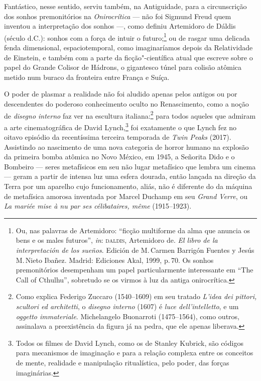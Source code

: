 Fantástico, nesse sentido, serviu também, na Antiguidade, para a
circunscrição dos sonhos premonitórios na \emph{Onirocrítica} --- não
foi Sigmund Freud quem inventou a interpretação dos sonhos ---, como
definiu Artemidoro de Dáldis (século  d.C.): sonhos com a força de
intuir o futuro;\footnote{Ou, nas palavras de Artemidoro: ``ficção
  multiforme da alma que anuncia os bens e os males futuros'',
  \emph{in}: \textsc{daldis}, Artemidoro de. \emph{El libro de la interpretación
  de los sueños}. Edición de M.\,Carmen Barrigón Fuentes y Jesús M.\,Nieto
  Ibañez. Madrid: Ediciones Akal, 1999, p.\,70. Os sonhos premonitórios
  desempenham um papel particularmente interessante em ``The Call of
  Cthulhu'', sobretudo se os virmos à luz da antiga onirocrítica.} ou
de rasgar uma delicada fenda dimensional, espaciotemporal, como
imaginaríamos depois da Relatividade de Einstein, e também com a parte
da ficção"-científica atual que escreve sobre o papel do Grande Colisor
de Hádrons, o gigantesco túnel para colisão atômica metido num buraco da
fronteira entre França e Suíça.

O poder de plasmar a realidade não foi aludido apenas pelos antigos ou
por descendentes do poderoso conhecimento oculto no Renascimento, como a
noção de \emph{disegno interno} faz ver na escultura italiana:\footnote{Como
  explica Federigo Zuccaro (1540--1609) em seu tratado \emph{L'idea dei
  pittori, scultori ed architetti}, o \emph{disegno interno} (1607) é
  \emph{luce dell'intelletto}, e um \emph{oggetto immateriale}.
  Michelangelo Buonarroti (1475--1564), como outros, assinalava a
  preexistência da figura já na pedra, que ele apenas liberava.} para
todos aqueles que admiram a arte cinematográfica de David
Lynch,\footnote{Todos os filmes de David Lynch, como os de Stanley
  Kubrick, são códigos para mecanismos de imaginação e para a relação
  complexa entre os conceitos de mente, realidade e manipulação
  ritualística, pelo poder, das forças imaginárias.} foi exatamente o
que Lynch fez no oitavo episódio da recentíssima terceira temporada de
\emph{Twin Peaks} (2017). Assistindo ao nascimento de uma nova categoria
de horror humano na explosão da primeira bomba atômica no Novo México,
em 1945, a Señorita Dido e o Bombeiro --- seres metafísicos em seu
não lugar metafísico que lembra um cinema --- geram a partir de intensa
luz uma esfera dourada, então lançada na direção da Terra por um
aparelho cujo funcionamento, aliás, não é diferente do da máquina de
metafísica amorosa inventada por Marcel Duchamp em seu \emph{Grand
Verre}, ou \emph{La mariée mise à nu par ses célibataires, même}
(1915--1923).

